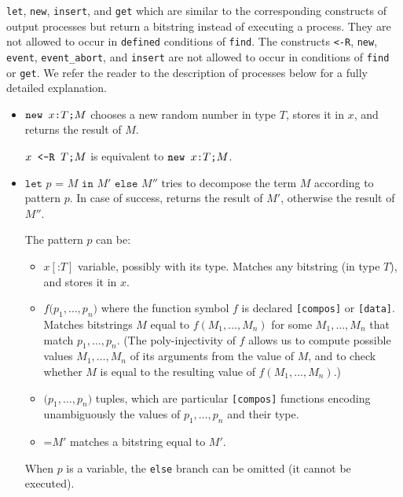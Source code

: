 \texttt{let}, \texttt{new}, \texttt{insert}, and \texttt{get} which are similar to the corresponding
constructs of output processes but return a bitstring instead of
executing a process. 
They are not allowed to occur in \texttt{defined} conditions of \texttt{find}.
The constructs \texttt{<-R}, \texttt{new}, \texttt{event}, \texttt{event\string_abort}, and \texttt{insert} are not allowed to 
occur in conditions of \texttt{find} or {\tt get}.
We refer the reader to the description of 
processes below for a fully detailed explanation.
\begin{itemize}

\item $\texttt{new\ }{x}\texttt{:}{T}\texttt{;}M$ chooses a new
random number in type $T$, stores it in $x$, and returns the result 
of $M$.

${x}\texttt{ <-R }{T}\texttt{;}M$ is equivalent to $\texttt{new\ }{x}\texttt{:}{T}\texttt{;}M$.

\item $\texttt{let }p \texttt{ = }M\texttt{ in }M'\texttt{ else }M''$
tries to decompose the term $M$ according to pattern $p$.
In case of success, returns the result of $M'$, otherwise 
the result of $M''$. 

The pattern $p$ can be:
\begin{itemize}

\item $x[\texttt{:}T]$ variable, possibly with its type. Matches any bitstring
(in type $T$), and stores it in $x$.

\item $f\texttt{(}p_1, \ldots, p_n\texttt{)}$ 
where the function symbol $f$ is declared 
\texttt{[compos]} or \texttt{[data]}. Matches bitstrings $M$ equal to $f(M_1, \ldots, M_n)$
for some $M_1, \ldots, M_n$ that match $p_1, \ldots, p_n$.
(The poly-injectivity of $f$ allows us to compute possible
values $M_1, \ldots, M_n$ of its arguments from the value of $M$, and to check
whether $M$ is equal to the resulting value of $f(M_1, \ldots, M_n)$.) 

\item $\texttt{(}p_1, \ldots, p_n\texttt{)}$ tuples, which are particular \texttt{[compos]}
functions encoding unambiguously the values of $p_1, \ldots, p_n$
and their type.

\item $\texttt{=}M'$ matches a bitstring equal to $M'$.

\end{itemize}
When $p$ is a variable, the \texttt{else}
branch can be omitted (it cannot be executed).


\end{itemize}
